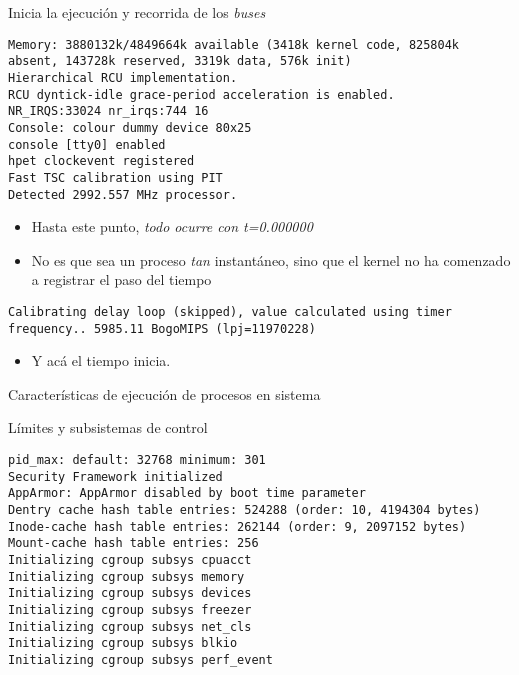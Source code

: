 \documentclass[presentation]{beamer}
\begin{document}
\begin{frame}[label={sec:org693b3fa},fragile]{Inicia la ejecución y recorrida de los \emph{buses}}
 \begin{verbatim}
Memory: 3880132k/4849664k available (3418k kernel code, 825804k absent, 143728k reserved, 3319k data, 576k init)
Hierarchical RCU implementation.
RCU dyntick-idle grace-period acceleration is enabled.
NR_IRQS:33024 nr_irqs:744 16
Console: colour dummy device 80x25
console [tty0] enabled
hpet clockevent registered
Fast TSC calibration using PIT
Detected 2992.557 MHz processor.
\end{verbatim}
\begin{itemize}
\item Hasta este punto, \emph{todo ocurre con t=0.000000}
\item No es que sea un proceso \emph{tan} instantáneo, sino que el kernel no
ha comenzado a registrar el paso del tiempo
\end{itemize}
\begin{verbatim}
Calibrating delay loop (skipped), value calculated using timer frequency.. 5985.11 BogoMIPS (lpj=11970228)
\end{verbatim}
\begin{itemize}
\item Y acá el tiempo inicia.
\end{itemize}
\end{frame}

\begin{frame}[label={sec:orgd08ea6e},fragile]{Características de ejecución de procesos en sistema}
 \begin{center}
Límites y subsistemas de control
\end{center}
\begin{verbatim}
pid_max: default: 32768 minimum: 301
Security Framework initialized
AppArmor: AppArmor disabled by boot time parameter
Dentry cache hash table entries: 524288 (order: 10, 4194304 bytes)
Inode-cache hash table entries: 262144 (order: 9, 2097152 bytes)
Mount-cache hash table entries: 256
Initializing cgroup subsys cpuacct
Initializing cgroup subsys memory
Initializing cgroup subsys devices
Initializing cgroup subsys freezer
Initializing cgroup subsys net_cls
Initializing cgroup subsys blkio
Initializing cgroup subsys perf_event
\end{verbatim}
\end{frame}
\end{document}
